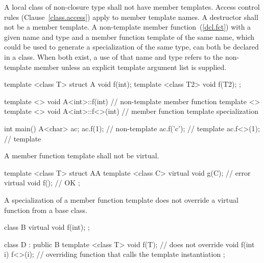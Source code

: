 \pnum
A local class of non-closure type shall not have member templates.
Access control rules (Clause~\ref{class.access})
apply to member template names.
A destructor shall not be a member
template.
A non-template member function~(\ref{dcl.fct}) with a given name
and type and a member function template of the same name, which could be
used to generate a specialization of the same type, can both be
declared in a class.
When both exist, a use of that name and type refers to the
non-template member unless an explicit template argument list is supplied.
\begin{example}

\begin{codeblock}
template <class T> struct A {
  void f(int);
  template <class T2> void f(T2);
};

template <> void A<int>::f(int) { }                     // non-template member function
template <> template <> void A<int>::f<>(int) { }       // member function template specialization

int main() {
  A<char> ac;
  ac.f(1);          // non-template
  ac.f('c');        // template
  ac.f<>(1);        // template
}
\end{codeblock}
\end{example}

\pnum
A member function template shall not be virtual.
\begin{example}

\begin{codeblock}
template <class T> struct AA {
  template <class C> virtual void g(C);   // error
  virtual void f();                       // OK
};
\end{codeblock}
\end{example}

\pnum
A specialization of
a member function template does not override a virtual function from a
base class.
\begin{example}
\begin{codeblock}
class B {
  virtual void f(int);
};

class D : public B {
  template <class T> void f(T); // does not override 
  void f(int i) { f<>(i); }     // overriding function that calls the template instantiation
};
\end{codeblock}
\end{example}

